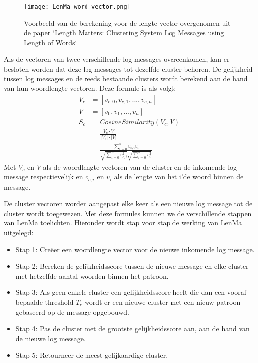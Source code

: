 \begin{figure}[!htp]
    \texttt{[image: LenMa\_word\_vector.png]}
    \caption{Voorbeeld van de berekening voor de lengte vector overgenomen uit de paper `Length Matters: Clustering System Log Messages using Length of Words` \autocite{shima2016length}}
\end{figure}
Als de vectoren van twee verschillende log messages overeenkomen, kan er besloten worden dat deze log messages tot dezelfde cluster behoren. De gelijkheid tussen log messages en de reeds bestaande clusters wordt berekend aan de hand van hun woordlengte vectoren. Deze formule is als volgt:
\begin{equation} \label{eq1}
    \begin{split}
        V_{c} & = [v_{c,0}, v_{c,1}, ... , v_{c,n}] \\
        V & = [v_{0}, v_{1}, ... , v_{n}] \\
        S_{c} & = CosineSimilarity(V_{c}, V) \\
        & = \frac{V_{c} \cdot V}{\lvert V_{c} \rvert \cdot \lvert V \rvert} \\
        & = \frac{\sum_{i=0}^{n} v_{c,i}v_{i}}{\sqrt{\sum_{i=0}^{n} v_{c,i}^{2}}\sqrt{\sum_{i=0}^{n} v_{i}^{2}}}
    \end{split}
\end{equation}
Met \(V_{c}\) en \(V\) als de woordlengte vectoren van de cluster en de inkomende log message respectievelijk en \(v_{c,i}\) en \(v_{i}\) als de lengte van het i'de woord binnen de message.

De cluster vectoren worden aangepast elke keer als een nieuwe log message tot de cluster wordt toegewezen. Met deze formules kunnen we de verschillende stappen van LenMa toelichten. Hieronder wordt stap voor stap de werking van LenMa uitgelegd:
\begin{itemize}
    \item Stap 1: Creëer een woordlengte vector voor de nieuwe inkomende log message.
    \item Stap 2: Bereken de gelijkheidsscore tussen de nieuwe message en elke cluster met hetzelfde aantal woorden binnen het patroon.
    \item Stap 3: Als geen enkele cluster een gelijkheidsscore heeft die dan een vooraf bepaalde threshold \(T_{c}\) wordt er een nieuwe cluster met een nieuw patroon gebaseerd op de message opgebouwd.
    \item Stap 4: Pas de cluster met de grootste gelijkheidsscore aan, aan de hand van de nieuwe log message. 
    \item Stap 5: Retourneer de meest gelijkaardige cluster.
\end{itemize}

